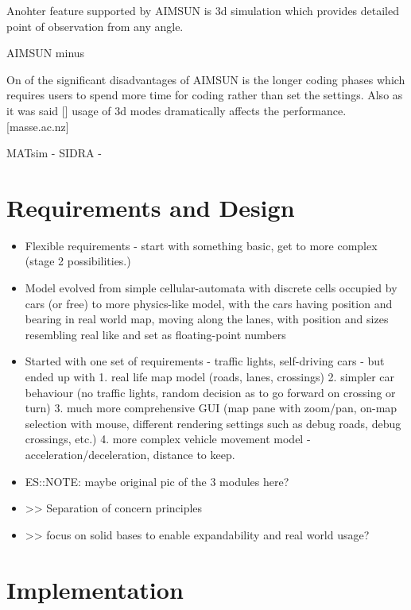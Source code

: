 Anohter feature  supported by AIMSUN is 3d simulation which provides detailed point of observation from any angle.

AIMSUN minus

On of the significant disadvantages of AIMSUN is the longer coding phases which
requires users to spend more time for coding rather than set the settings.
Also as it was said [] usage of 3d modes dramatically affects the performance.[masse.ac.nz]

 MATsim -
 SIDRA -


\section{Requirements and Design}
\begin{itemize}
    \item Flexible requirements - start with something basic, get to more complex (stage 2 possibilities.)
    \item Model evolved from simple cellular-automata with discrete cells occupied by cars (or free) to more physics-like model, with the cars having position and bearing in real world map, moving along the lanes, with position and sizes resembling real like and set as floating-point numbers
    \item Started with one set of requirements - traffic lights, self-driving cars - but ended up with 1. real life map model (roads, lanes, crossings) 2. simpler car behaviour (no traffic lights, random decision as to go forward on crossing or turn) 3. much more comprehensive GUI (map pane with zoom/pan, on-map selection with mouse, different rendering settings such as debug roads, debug crossings, etc.) 4. more complex vehicle movement model - acceleration/deceleration, distance to keep.
	\item ES::NOTE: maybe original pic of the 3 modules here?
	\item >> Separation of concern principles
	\item >> focus on solid bases to enable expandability and real world usage?
\end{itemize}



\section{Implementation}

